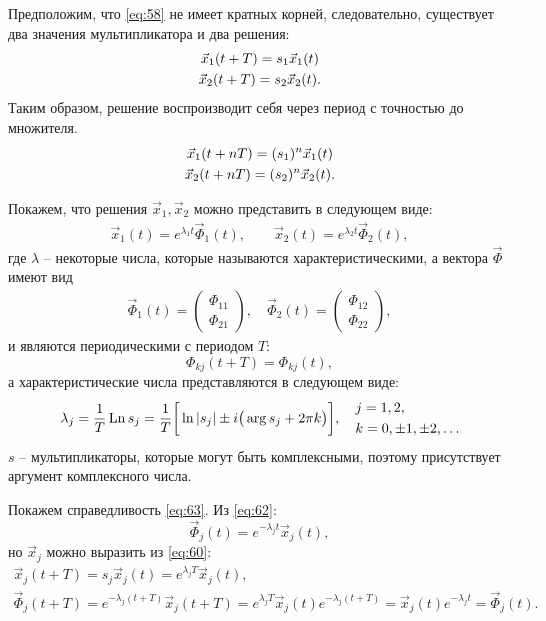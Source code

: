 Предположим, что \eqref{eq:58} не имеет кратных корней, следовательно, существует два значения мультипликатора и два
решения:
\begin{gather}
	\vec{x}_1(t+T)=s_1\vec{x}_1(t) \notag \\ 
	\vec{x}_2(t+T)=s_2\vec{x}_2(t).		
	\label{eq:60}
\end{gather}
Таким образом, решение воспроизводит себя через период с точностью до множителя.
\begin{gather}
	\vec{x}_1(t+nT)=(s_1)^n\vec{x}_1(t) \notag \\ 
	\vec{x}_2(t+nT)=(s_2)^n\vec{x}_2(t).		
	\label{eq:61}
\end{gather}

Покажем, что решения $\vec{x}_1,\vec{x}_2$ можно представить в следующем виде:
\begin{gather}
	\vec{x}_1(t)=e^{\lambda_1t}\vec{\Phi}_1(t), \qquad
	\vec{x}_2(t)=e^{\lambda_2t}\vec{\Phi}_2(t),		
	\label{eq:62}
\end{gather}
где $\lambda$ -- некоторые числа, которые называются характеристическими, а вектора $\vec{\Phi}$ имеют вид 
\begin{gather*}
	\vec{\Phi}_1(t)= 
	\begin{pmatrix}
		\Phi_{11} \\
		\Phi_{21}
	\end{pmatrix}
	,\quad
	\vec{\Phi}_2(t)= 
	\begin{pmatrix}
		\Phi_{12} \\
		\Phi_{22}
	\end{pmatrix}
	,
\end{gather*}
и являются периодическими с периодом $T$:
\begin{equation}
	\Phi_{kj}(t+T)=\Phi_{kj}(t),
	\label{eq:63}
\end{equation}
а характеристические числа представляются в следующем виде:
\begin{gather}
	\lambda_j=\frac{1}{T}\,\mathrm{Ln}\,s_j=\frac1{T}\qty[\vphantom{\bigg|}\ln|s_j|\pm i\qty(\vphantom{\big|}\arg s_j +2\pi k)], \quad
	\begin{aligned}
		&j=1,2, \\
		&k=0,\pm 1, \pm 2, \ldots	
	\end{aligned}
	\label{eq:64}
\end{gather}
$s$ -- мультипликаторы, которые могут быть комплексными, поэтому присутствует аргумент комплексного числа.

Покажем справедливость \eqref{eq:63}. Из \eqref{eq:62}:
\begin{equation*}
	\vec{\Phi}_j(t)=e^{-\lambda_j t}\vec{x}_j(t),
\end{equation*}
но $\vec{x}_j$ можно выразить из \eqref{eq:60}:
\begin{gather*}
	\vec{x}_j(t+T)=s_j\vec{x}_j(t)=e^{\lambda_j T}\vec{x}_j(t), \\
	\vec{\Phi}_j(t+T)=e^{-\lambda_j(t+T)}\vec{x}_j(t+T)=e^{\lambda_j T}\vec{x}_j(t)e^{-\lambda_j(t+T)}=\vec{x}_j(t)e^{-\lambda_j t}=\vec{\Phi}_j(t).
\end{gather*}

